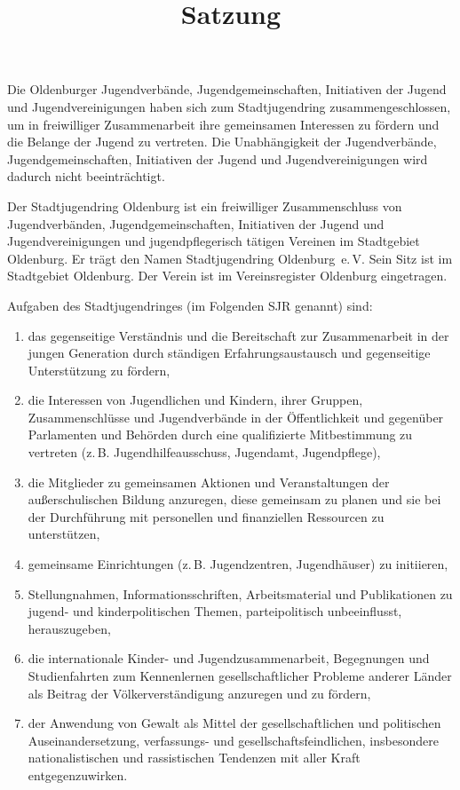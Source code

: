 \documentclass[10pt,a4paper,oneside,parskip=half]{scrartcl}
\title{Satzung}
\date{}
\author{}
\begin{document}
\maketitle

\begin{contract}

Die Oldenburger Jugendverbände, Jugendgemeinschaften, Initiativen der Jugend und Jugendvereinigungen haben sich zum Stadtjugendring zusammengeschlossen, um in freiwilliger Zusammenarbeit ihre gemeinsamen Interessen zu fördern und die Belange der Jugend zu vertreten. Die Unabhängigkeit der Jugendverbände, Jugendgemeinschaften, Initiativen der Jugend und Jugendvereinigungen wird dadurch nicht beeinträchtigt.

Der Stadtjugendring Oldenburg ist ein freiwilliger Zusammenschluss von Jugendverbänden, Jugendgemeinschaften, Initiativen der Jugend und Jugendvereinigungen und jugendpflegerisch tätigen Vereinen im Stadtgebiet Oldenburg.
Er trägt den Namen Stadtjugendring Oldenburg~e.\,V. Sein Sitz ist im Stadtgebiet Oldenburg. Der Verein ist im Vereinsregister Oldenburg eingetragen.

\label{aufgaben}
Aufgaben des Stadtjugendringes (im Folgenden SJR genannt) sind:
\begin{enumerate}
\item das gegenseitige Verständnis und die Bereitschaft zur Zusammenarbeit in der jungen Generation durch ständigen Erfahrungsaustausch und gegenseitige Unterstützung zu fördern,
\item die Interessen von Jugendlichen und Kindern, ihrer Gruppen, Zusammenschlüsse und Jugendverbände in der Öffentlichkeit und gegenüber Parlamenten und Behörden durch eine qualifizierte Mitbestimmung zu vertreten (z.\,B. Jugendhilfeausschuss, Jugendamt, Jugendpflege),
\item die Mitglieder zu gemeinsamen Aktionen und Veranstaltungen der außerschulischen Bildung anzuregen, diese gemeinsam zu planen und sie bei der Durchführung mit personellen und finanziellen Ressourcen zu unterstützen,
\item gemeinsame Einrichtungen (z.\,B. Jugendzentren, Jugendhäuser) zu initiieren,
\item Stellungnahmen, Informationsschriften, Arbeitsmaterial und Publikationen zu jugend- und kinderpolitischen Themen, parteipolitisch unbeeinflusst, herauszugeben,
\item die internationale Kinder- und Jugendzusammenarbeit, Begegnungen und Studienfahrten zum Kennenlernen gesellschaftlicher Probleme anderer Länder als Beitrag der Völkerverständigung anzuregen und zu fördern,
\item der Anwendung von Gewalt als Mittel der gesellschaftlichen und politischen Auseinandersetzung, verfassungs- und gesellschaftsfeindlichen, insbesondere nationalistischen und rassistischen Tendenzen mit aller Kraft entgegenzuwirken.
\end{enumerate}


\end{contract}
\end{document}

